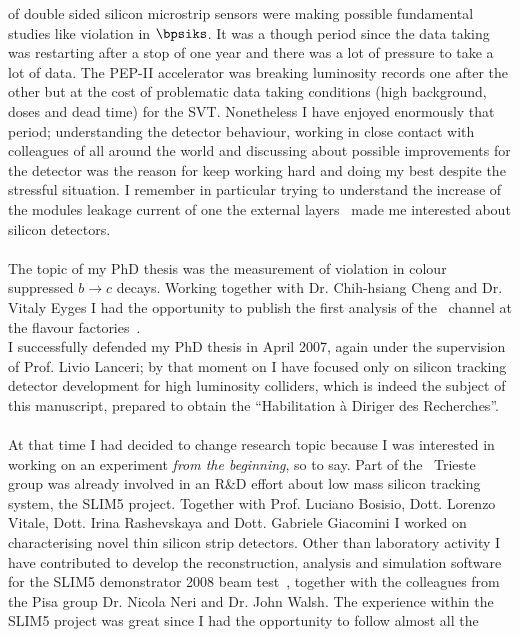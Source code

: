 of double sided silicon microstrip sensors were making possible fundamental studies like \CP violation in $\bpsiks$. It was a though period since the data taking was restarting after a stop of one year and there 
was a lot of pressure to take a lot of data. The PEP-II accelerator was breaking luminosity records 
one after the other but at the cost of problematic data taking conditions (high background, doses 
and dead time) for the SVT. Nonetheless I have enjoyed enormously that period; understanding 
the detector behaviour, working in close contact with colleagues of all around the world and discussing 
about possible improvements for the detector was the reason for keep working hard and doing my best 
despite the stressful situation. I remember in particular trying to understand the increase of the modules 
leakage current of one the external layers~\cite{babar_leakage} made me interested about silicon detectors.
\\
\\The topic of my PhD thesis was the measurement of \CP violation in colour suppressed $b\to c$ decays.
Working together with Dr. Chih-hsiang Cheng and Dr.  Vitaly Eyges I had the opportunity to publish 
the first analysis of the \BDh\ channel at the flavour factories~\cite{PhysRevLett.99.081801}.
\\ I successfully defended my PhD thesis in April 2007, again under the supervision of Prof. Livio Lanceri;
  by that moment on I have focused only on 
silicon tracking detector development for high luminosity colliders, which is indeed the subject of this 
manuscript, prepared to obtain the  ``Habilitation \`a Diriger des Recherches''.
\\
\\
At that time I had decided to change research topic because I was interested in working on an experiment 
{\it from the beginning}, so to say. Part of the   \babar\ Trieste group was already involved in an R\&D 
effort about low mass silicon tracking system, the SLIM5 project. 
Together with Prof. Luciano Bosisio, Dott. Lorenzo Vitale, Dott. Irina Rashevskaya and Dott. Gabriele 
Giacomini I worked on characterising novel thin silicon strip detectors. Other than laboratory activity 
I have contributed to develop the reconstruction, analysis and simulation software for the SLIM5 
demonstrator 2008 beam test~\cite{BETTARINI2010942}, together with the colleagues from the Pisa group 
Dr. Nicola Neri and Dr. John Walsh.  
The experience within the SLIM5 project  was great since I had the opportunity to follow almost all the  
